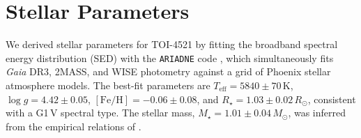 \section{Stellar Parameters}
\label{sec:star}

We derived stellar parameters for TOI-4521 by fitting the broadband
spectral energy distribution (SED) with the \texttt{ARIADNE} code
\citep{Vines2022}, which simultaneously fits \textit{Gaia} DR3, 2MASS,
and WISE photometry against a grid of Phoenix stellar atmosphere models.
The best-fit parameters are $T_\mathrm{eff} = 5840 \pm 70\,\mathrm{K}$,
$\log g = 4.42 \pm 0.05$, $[\mathrm{Fe/H}] = -0.06 \pm 0.08$, and
$R_\star = 1.03 \pm 0.02\,R_\odot$, consistent with a G1\,V spectral type.
The stellar mass, $M_\star = 1.01 \pm 0.04\,M_\odot$, was inferred from
the empirical relations of \citet{Torres2010}.

